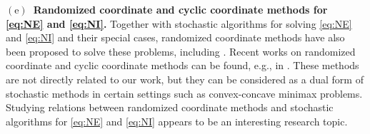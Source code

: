\documentclass{article}
\newcommand{\beforesubsec}{\vspace{-1.5ex}}
\theoremstyle{plain}
\theoremstyle{definition}
\theoremstyle{remark}
\begin{document}

\noindent\textbf{$\mathrm{(e)}$~Randomized coordinate and cyclic coordinate methods for \eqref{eq:NE} and \eqref{eq:NI}.}
Together with stochastic algorithms for solving \eqref{eq:NE} and \eqref{eq:NI} and their special cases, randomized coordinate methods have also been proposed to solve these problems, including \citep{combettes2018asynchronous,combettes2015stochastic,peng2016arock}.
Recent works on randomized coordinate and cyclic coordinate methods can be found, e.g., in \citep{chakrabarti2024block,cui2021analysis,hamedani2018iteration,song2023cyclic,tran2022accelerated,yousefian2018stochastic}.
These methods are not directly related to our work, but they can be considered as a dual form of stochastic methods in certain settings such as convex-concave minimax problems.
Studying relations between randomized coordinate methods and stochastic algorithms for \eqref{eq:NE} and \eqref{eq:NI} appears to be an interesting research topic.


\beforesubsec
\end{document}
